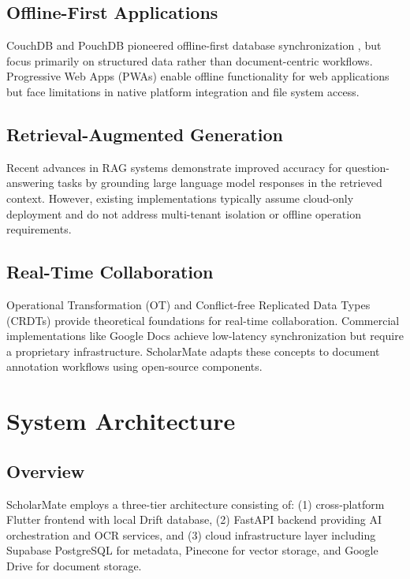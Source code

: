 \documentclass[conference]{IEEEtran}
\begin{document}
\subsection{Offline-First Applications}

CouchDB and PouchDB pioneered offline-first database synchronization \cite{b3}, but focus primarily on structured data rather than document-centric workflows. Progressive Web Apps (PWAs) enable offline functionality for web applications but face limitations in native platform integration and file system access.

\subsection{Retrieval-Augmented Generation}

Recent advances in RAG systems \cite{b4} demonstrate improved accuracy for question-answering tasks by grounding large language model responses in the retrieved context. However, existing implementations typically assume cloud-only deployment and do not address multi-tenant isolation or offline operation requirements.

\subsection{Real-Time Collaboration}

Operational Transformation (OT) \cite{b5} and Conflict-free Replicated Data Types (CRDTs) \cite{b6} provide theoretical foundations for real-time collaboration. Commercial implementations like Google Docs achieve low-latency synchronization but require a proprietary infrastructure. ScholarMate adapts these concepts to document annotation workflows using open-source components.

\section{System Architecture}

\subsection{Overview}

ScholarMate employs a three-tier architecture consisting of: (1) cross-platform Flutter frontend with local Drift database, (2) FastAPI backend providing AI orchestration and OCR services, and (3) cloud infrastructure layer including Supabase PostgreSQL for metadata, Pinecone for vector storage, and Google Drive for document storage.
\end{document}
